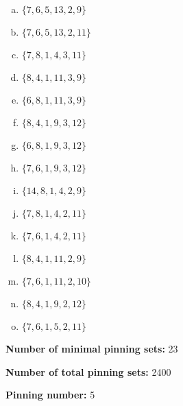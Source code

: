 \documentclass{article}%
\begin{document}
\begin{multicols}{2}
\begin{enumerate}[a)]
\item{\Huge\textcolor{blue4}{\textbullet}}$\{7,6,5,13,2,9\}$

\item{\Huge\textcolor{blue5}{\textbullet}}$\{7,6,5,13,2,11\}$

\item{\Huge\textcolor{blue6}{\textbullet}}$\{7,8,1,4,3,11\}$

\item{\Huge\textcolor{blue7}{\textbullet}}$\{8,4,1,11,3,9\}$

\item{\Huge\textcolor{blue8}{\textbullet}}$\{6,8,1,11,3,9\}$

\item{\Huge\textcolor{blue9}{\textbullet}}$\{8,4,1,9,3,12\}$

\item{\Huge\textcolor{blue10}{\textbullet}}$\{6,8,1,9,3,12\}$

\item{\Huge\textcolor{blue11}{\textbullet}}$\{7,6,1,9,3,12\}$

\item{\Huge\textcolor{blue12}{\textbullet}}$\{14,8,1,4,2,9\}$

\item{\Huge\textcolor{blue13}{\textbullet}}$\{7,8,1,4,2,11\}$

\item{\Huge\textcolor{blue14}{\textbullet}}$\{7,6,1,4,2,11\}$

\item{\Huge\textcolor{blue15}{\textbullet}}$\{8,4,1,11,2,9\}$

\item{\Huge\textcolor{blue16}{\textbullet}}$\{7,6,1,11,2,10\}$

\item{\Huge\textcolor{blue17}{\textbullet}}$\{8,4,1,9,2,12\}$

\item{\Huge\textcolor{blue18}{\textbullet}}$\{7,6,1,5,2,11\}$

\end{enumerate}


\noindent\textbf{Number of minimal pinning sets:} 23

\noindent\textbf{Number of total pinning sets:} 2400

\noindent\textbf{Pinning number:} 5


\end{multicols}
\end{document}
